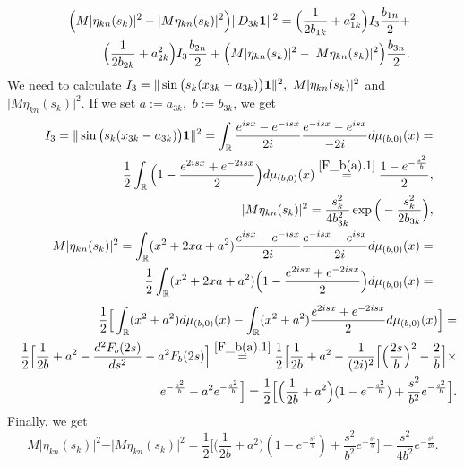 \documentclass[preprint,12pt]{elsarticle}
\numberwithin{equation}{section}
\begin{document}
\begin{pf}
\begin{eqnarray}
\nonumber
&&
 \Big(M\vert\eta_{kn}(s_k)\vert^2-\vert M\eta_{kn}(s_k)\vert^2\Big)
\Vert D_{3k}{\bf 1}\Vert^2=
\Big(\frac{1}{2b_{1k}}+a^2_{1k}\Big)I_3\frac{b_{1n}}{2}+
\\
\label{norm(g_k)}
&&
\Big(\frac{1}{2b_{2k}}+a^2_{2k}\Big)I_3\frac{b_{2n}}{2}+
 \Big(M\vert\eta_{kn}(s_k)\vert^2-\vert M\eta_{kn}(s_k)\vert^2\Big)\frac{b_{3n}}{2}.
\end{eqnarray}
We need to calculate $I_3=\Vert \sin\big(s_k(x_{3k}-a_{3k})\big){\bf 1}\Vert^2,\,\,M\vert\eta_{kn}(s_k)\vert^2$ and $\vert M\eta_{kn}(s_k)\vert^2$.
If we  set $a:=a_{3k},\,\,b:=b_{3k}$, we get
\begin{eqnarray}
\nonumber 
&&I_3=\Vert \sin\big(s_k(x_{3k}-a_{3k})\big){\bf 1}\Vert^2=
\int_{\mathbb R}
\frac{e^{isx}-e^{-isx}}{2i}\frac{e^{-isx}-e^{isx}}{-2i}d\mu_{(b,0)}(x)=
\\
\label{I_3}
&&
\frac{1}{2}\int_{\mathbb R}
\Big(1-\frac{e^{2isx}+e^{-2isx}}{2}\Big)
d\mu_{(b,0)}(x)\stackrel{\eqref{F_b(a).1}}{=}
\frac{1-e^{-\frac{s^2}{b}}}{2},
\\
\label{M-eta-3}
&&\vert M\eta_{kn}(s_k)\vert^2=\frac{s^2_k}{4b^2_{3k}}\exp\Big(-\frac{s_k^2}{2b_{3k}}\Big),\\
\nonumber 
&&M\vert\eta_{kn}(s_k)\vert^2=
\int_{\mathbb R}(x^2+2xa+a^2)
\frac{e^{isx}-e^{-isx}}{2i}\frac{e^{-isx}-e^{isx}}{-2i}d\mu_{(b,0)}(x)=\\
\nonumber
&&
\frac{1}{2}\int_{\mathbb R}(x^2+2xa+a^2)
\Big(1-\frac{e^{2isx}+e^{-2isx}}{2}\Big)
d\mu_{(b,0)}(x)=
\end{eqnarray}
\begin{eqnarray}
\nonumber
&&
\frac{1}{2}\Big[
\int_{\mathbb R}(x^2+a^2)d\mu_{(b,0)}(x)-
\int_{\mathbb R}(x^2+a^2)\frac{e^{2isx}+e^{-2isx}}{2}
d\mu_{(b,0)}(x)\Big]=\\
\nonumber
&&
\frac{1}{2}\Big[\frac{1}{2b}+a^2-\frac{d^2F_b(2s)}{ds^2}-a^2F_b(2s)\Big]\stackrel{\eqref{F_b(a).1}}{=}\frac{1}{2}\Big[\frac{1}{2b}+a^2-\frac{1}{(2i)^2}\Big[\Big(\frac{2s}{b}\Big)^2-\frac{2}{b}\Big]\times\\
\label{M-eta-fin}
&&
e^{-\frac{s^2}{b}}-a^2e^{-\frac{s^2}{b}}\Big]=
\frac{1}{2}\Big[\Big(\frac{1}{2b}+a^2\Big)(1-e^{-\frac{s^2}{b}})+
\frac{s^2}{b^2}e^{-\frac{s^2}{b}}\Big].
\end{eqnarray}
Finally, we get
\begin{equation}
\label{eta-eta}
M\vert\eta_{kn}(s_k)\vert^2- \vert M\eta_{kn}(s_k)\vert^2=
\frac{1}{2}\Big[\Big(\frac{1}{2b}+a^2\Big)(1-e^{-\frac{s^2}{b}})+
\frac{s^2}{b^2}e^{-\frac{s^2}{b}}\Big]-
\frac{s^2}{4b^2}e^{-\frac{s^2}{2b}}.

\end{equation}
\end{pf}
\end{document}
